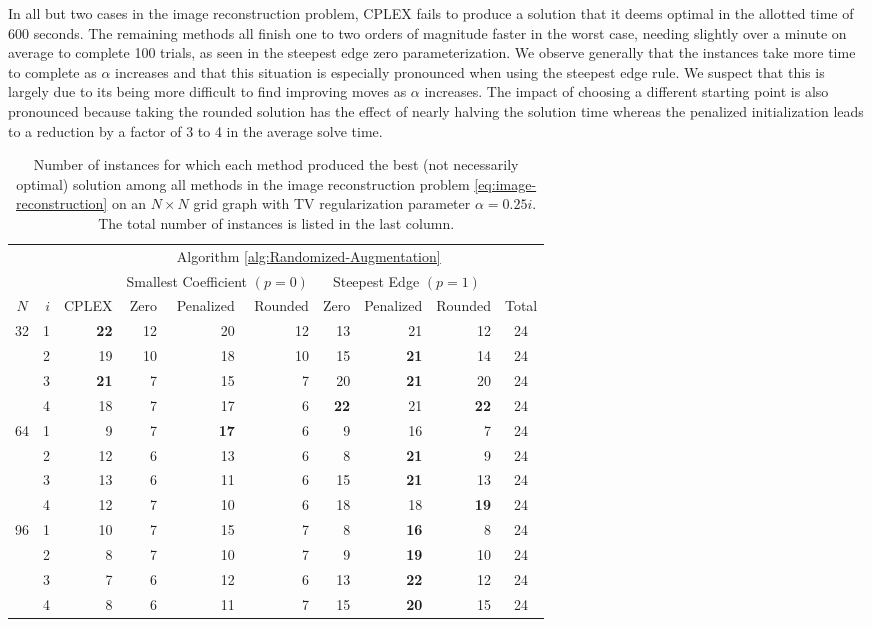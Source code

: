 \documentclass[pdflatex,sn-mathphys-num]{sn-jnl}%
\begin{document}
In all but two cases in the image reconstruction problem, CPLEX fails to produce a solution that it deems optimal in the allotted time of 600 seconds. The remaining methods all finish one to two orders of magnitude faster in the worst case, needing slightly over a minute on average to complete 100 trials, as seen in the steepest edge zero parameterization. We observe generally that the instances take more time to complete as $\alpha$ increases and that this situation is especially pronounced when using the steepest edge rule. We suspect that this is largely due to its being more difficult to find improving moves as $\alpha$ increases. The impact of choosing a different starting point is also pronounced because taking the rounded solution has the effect of nearly halving the solution time whereas the penalized initialization leads to a reduction by a factor of 3 to 4 in the average solve time. 

\begin{table}[]
    \centering
\begin{tabular}{cr|r|rrr|rrr|c}
 &  &       & \multicolumn{6}{c|}{Algorithm \ref{alg:Randomized-Augmentation}} & \\
 &  &       & \multicolumn{3}{c}{Smallest Coefficient $(p=0)$} & \multicolumn{3}{|c|}{Steepest Edge $(p=1)$} \\
 $N$ & $i$ & CPLEX & Zero & Penalized & Rounded & Zero & Penalized & Rounded & Total\\
\hline
\multirow[t]{4}{*}{32} & 1 & \textbf{22} & 12 & 20 & 12 & 13 & 21 & 12 & 24\\
 & 2 & 19 & 10 & 18 & 10 & 15 & \textbf{21} & 14 & 24\\
 & 3 & \textbf{21} & 7 & 15 & 7 & 20 & \textbf{21} & 20 & 24\\
 & 4 & 18 & 7 & 17 & 6 & \textbf{22} & 21 & \textbf{22} & 24\\
\hline
\multirow[t]{4}{*}{64} & 1 & 9 & 7 & \textbf{17} & 6 & 9 & 16 & 7 & 24\\
 & 2 & 12 & 6 & 13 & 6 & 8 & \textbf{21} & 9 & 24\\
 & 3 & 13 & 6 & 11 & 6 & 15 & \textbf{21} & 13 & 24\\
 & 4 & 12 & 7 & 10 & 6 & 18 & 18 & \textbf{19} & 24\\
\hline
\multirow[t]{4}{*}{96} & 1 & 10 & 7 & 15 & 7 & 8 & \textbf{16} & 8 & 24\\
 & 2 & 8 & 7 & 10 & 7 & 9 & \textbf{19} & 10 & 24\\
 & 3 & 7 & 6 & 12 & 6 & 13 & \textbf{22} & 12 & 24\\
 & 4 & 8 & 6 & 11 & 7 & 15 & \textbf{20} & 15 & 24\\

\end{tabular}
    \caption{Number of instances for which each method produced the best (not necessarily optimal) solution among all methods in the image reconstruction problem \eqref{eq:image-reconstruction} on an $N\times N$ grid graph with TV regularization parameter $\alpha=0.25i$. The total number of instances is listed in the last column.}
    \label{tab:image-wins}
\end{table}
\end{document}
